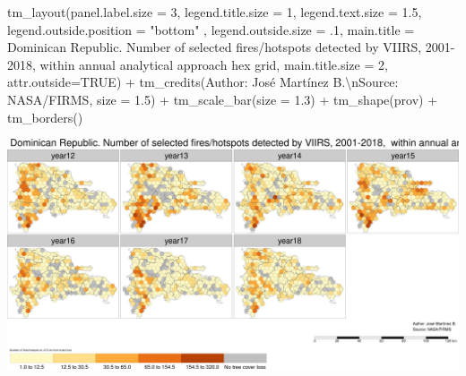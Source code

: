 \documentclass[10pt,landscape,a3paper]{article}
\newenvironment{Shaded}{\begin{snugshade}}{\end{snugshade}}
\newcommand{\AttributeTok}[1]{\textcolor[rgb]{0.77,0.63,0.00}{#1}}
\newcommand{\ConstantTok}[1]{\textcolor[rgb]{0.00,0.00,0.00}{#1}}
\newcommand{\DecValTok}[1]{\textcolor[rgb]{0.00,0.00,0.81}{#1}}
\newcommand{\FloatTok}[1]{\textcolor[rgb]{0.00,0.00,0.81}{#1}}
\newcommand{\FunctionTok}[1]{\textcolor[rgb]{0.00,0.00,0.00}{#1}}
\newcommand{\NormalTok}[1]{#1}
\newcommand{\SpecialCharTok}[1]{\textcolor[rgb]{0.00,0.00,0.00}{#1}}
\newcommand{\StringTok}[1]{\textcolor[rgb]{0.31,0.60,0.02}{#1}}
\begin{document}
\begin{Shaded}
\begin{Highlighting}[]
  \FunctionTok{tm\_layout}\NormalTok{(}\AttributeTok{panel.label.size =} \DecValTok{3}\NormalTok{, }\AttributeTok{legend.title.size =} \DecValTok{1}\NormalTok{, }\AttributeTok{legend.text.size =} \FloatTok{1.5}\NormalTok{,}
            \AttributeTok{legend.outside.position =} \StringTok{"bottom"}\NormalTok{ , }\AttributeTok{legend.outside.size =}\NormalTok{ .}\DecValTok{1}\NormalTok{,}
            \AttributeTok{main.title =} \StringTok{\textquotesingle{}Dominican Republic. Number of selected fires/hotspots detected by VIIRS, 2001{-}2018,  within annual analytical approach hex grid\textquotesingle{}}\NormalTok{,}
            \AttributeTok{main.title.size =} \DecValTok{2}\NormalTok{, }\AttributeTok{attr.outside=}\ConstantTok{TRUE}\NormalTok{) }\SpecialCharTok{+} 
  \FunctionTok{tm\_credits}\NormalTok{(}\StringTok{\textquotesingle{}Author: José Martínez B.}\SpecialCharTok{\textbackslash{}n}\StringTok{Source: NASA/FIRMS\textquotesingle{}}\NormalTok{, }\AttributeTok{size =} \FloatTok{1.5}\NormalTok{) }\SpecialCharTok{+}
  \FunctionTok{tm\_scale\_bar}\NormalTok{(}\AttributeTok{size =} \FloatTok{1.3}\NormalTok{) }\SpecialCharTok{+}
  \FunctionTok{tm\_shape}\NormalTok{(prov) }\SpecialCharTok{+} \FunctionTok{tm\_borders}\NormalTok{()}
\end{Highlighting}
\end{Shaded}

\begin{center}\includegraphics{img/data-download-preparation-eda/zonal-annual-grid-4} \end{center}
\end{document}
